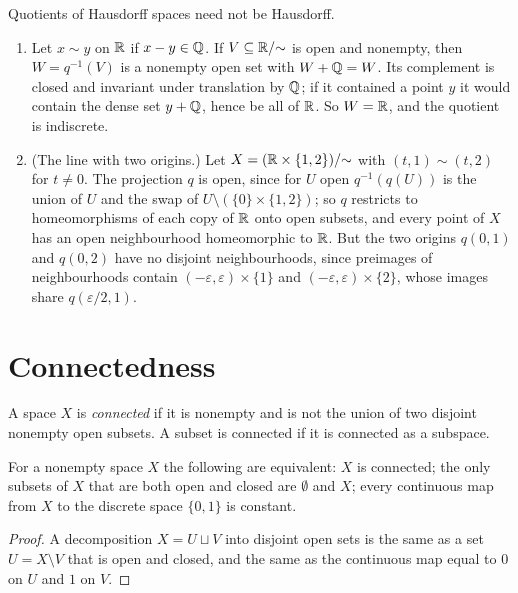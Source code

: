 \begin{counterexample}\label{general-topology:counterexample-bad-quotients}
Quotients of Hausdorff spaces need not be Hausdorff.
\begin{enumerate}
\item Let $x \sim y$ on $\mathbb{R}$ if $x - y \in \mathbb{Q}$. If $V \subseteq \mathbb{R}/{\sim}$ is open and nonempty, then $W = q^{-1}(V)$ is a nonempty open set with
$W + \mathbb{Q} = W$. Its complement is closed and invariant under translation by $\mathbb{Q}$; if it contained a point $y$ it would contain the dense set $y + \mathbb{Q}$,
hence be all of $\mathbb{R}$. So $W = \mathbb{R}$, and the quotient is indiscrete.
\item (The line with two origins.) Let $X = (\mathbb{R} \times \{1, 2\})/{\sim}$ with $(t, 1) \sim (t, 2)$ for $t \neq 0$. The projection $q$ is open, since for
$U$ open $q^{-1}(q(U))$ is the union of $U$ and the swap of $U \setminus (\{0\} \times \{1, 2\})$; so $q$ restricts to homeomorphisms of each copy of $\mathbb{R}$
onto open subsets, and every point of $X$ has an open neighbourhood homeomorphic to $\mathbb{R}$. But the two origins $q(0, 1)$ and $q(0, 2)$ have no
disjoint neighbourhoods, since preimages of neighbourhoods contain $(-\varepsilon, \varepsilon) \times \{1\}$ and $(-\varepsilon, \varepsilon) \times \{2\}$,
whose images share $q(\varepsilon/2, 1)$.
\end{enumerate}
\end{counterexample}

\section{Connectedness}\label{general-topology:section-connectedness}

\begin{definition}\label{general-topology:definition-connected}
A space $X$ is \emph{connected} if it is nonempty and is not the union of two disjoint nonempty open subsets. A subset is connected if it is
connected as a subspace.
\end{definition}

\begin{lemma}\label{general-topology:lemma-connected-criteria}
For a nonempty space $X$ the following are equivalent: $X$ is connected; the only subsets of $X$ that are both open and closed are $\emptyset$ and
$X$; every continuous map from $X$ to the discrete space $\{0, 1\}$ is constant.
\end{lemma}

\begin{proof}
A decomposition $X = U \sqcup V$ into disjoint open sets is the same as a set $U = X \setminus V$ that is open and closed, and the same as the
continuous map equal to $0$ on $U$ and $1$ on $V$.
\end{proof}

